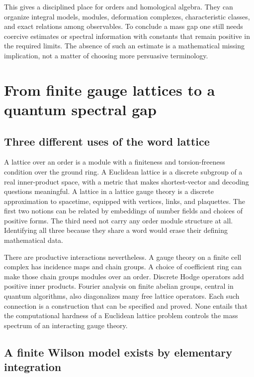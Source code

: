This gives a disciplined place for orders and homological algebra.  They
can organize integral models, modules, deformation complexes, characteristic
classes, and exact relations among observables.  To conclude a mass gap
one still needs coercive estimates or spectral information with constants
that remain positive in the required limits.  The absence of such an
estimate is a mathematical missing implication, not a matter of choosing
more persuasive terminology.

\chapter{From finite gauge lattices to a quantum spectral gap}
\label{chap:quantum-gap}

\section{Three different uses of the word lattice}

A lattice over an order is a module with a finiteness and torsion-freeness
condition over the ground ring.  A Euclidean lattice is a discrete subgroup
of a real inner-product space, with a metric that makes shortest-vector and
decoding questions meaningful.  A lattice in a lattice gauge theory is a
discrete approximation to spacetime, equipped with vertices, links, and
plaquettes.  The first two notions can be related by embeddings of number
fields and choices of positive forms.  The third need not carry any order
module structure at all.  Identifying all three because they share a word
would erase their defining mathematical data.

There are productive interactions nevertheless.  A gauge theory on a finite
cell complex has incidence maps and chain groups.  A choice of coefficient
ring can make those chain groups modules over an order.  Discrete Hodge
operators add positive inner products.  Fourier analysis on finite abelian
groups, central in quantum algorithms, also diagonalizes many free lattice
operators.  Each such connection is a construction that can be specified
and proved.  None entails that the computational hardness of a Euclidean
lattice problem controls the mass spectrum of an interacting gauge theory.

\section{A finite Wilson model exists by elementary integration}

